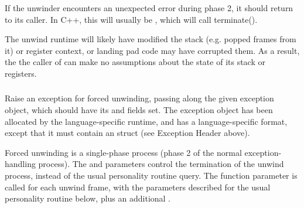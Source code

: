 If the unwinder encounters an unexpected error during phase 2,
it should return  to its caller.
In C++, this will usually be , which will call terminate().

The unwind runtime will likely have modified the stack (e.g. popped
frames from it) or register context, or landing pad code may have
corrupted them. As a result, the the caller of 
can make no assumptions about the state of its stack or registers.

\subsubsection{}



Raise an exception for forced unwinding, passing along the given
exception object, which should have its  and
 fields set. The exception object has been allocated
by the language-specific runtime, and has a language-specific format,
except that it must contain an  struct (see Exception
Header above).

Forced unwinding is a single-phase process (phase 2 of the normal
exception-handling process). The  and
 parameters control the termination of the
unwind process, instead of the usual personality routine query. The
 function parameter is called for each unwind frame, with
the parameters described for the usual personality routine below, plus
an additional .

